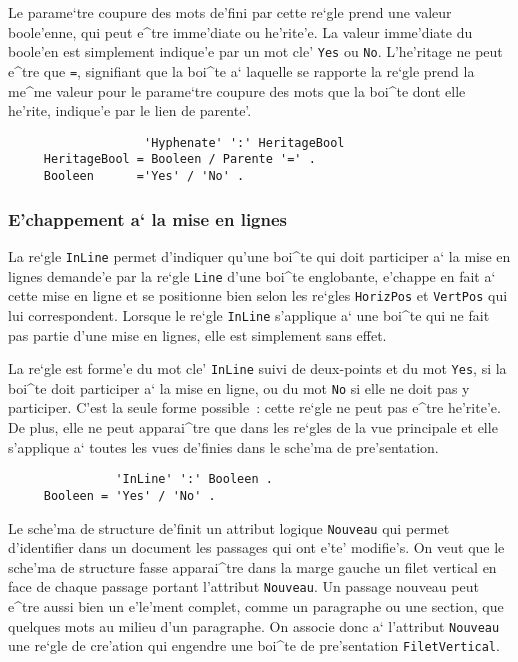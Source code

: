 {Le parame`tre coupure des mots de'fini
par cette re`gle prend une valeur boole'enne, qui peut e^tre imme'diate ou
he'rite'e. La valeur imme'diate du boole'en est simplement indique'e par un
mot cle' {\tt Yes} ou {\tt No}. L'he'ritage ne peut e^tre que {\tt =},
signifiant que la boi^te a` laquelle se rapporte la re`gle prend la me^me
valeur pour le parame`tre coupure des mots que la boi^te dont elle he'rite,
indique'e par le lien de parente'.

\begin{verbatim}
                   'Hyphenate' ':' HeritageBool
     HeritageBool = Booleen / Parente '=' .
     Booleen      ='Yes' / 'No' .
\end{verbatim}

\subsubsection{E'chappement a` la mise en lignes}
\label{regleinline}

La re`gle {\tt InLine} permet d'indiquer qu'une boi^te qui doit participer
a` la mise en lignes demande'e par la re`gle {\tt Line} d'une boi^te
englobante, e'chappe en fait a` cette mise en ligne et se positionne bien
selon les re`gles {\tt HorizPos} et {\tt VertPos} qui lui correspondent.
Lorsque le re`gle {\tt InLine} s'applique a` une boi^te qui ne fait pas
partie d'une mise en lignes, elle est simplement sans effet.

La re`gle est forme'e du mot cle' {\tt InLine} suivi de deux-points et du
mot {\tt Yes}, si la boi^te doit participer a` la mise en ligne, ou du
mot {\tt No} si elle ne doit pas y participer. C'est la seule forme
possible~: cette re`gle ne peut pas e^tre he'rite'e. De plus, elle ne peut
apparai^tre que dans les re`gles de la vue principale et elle s'applique a`
toutes les vues de'finies dans le sche'ma de pre'sentation.

\begin{verbatim}
               'InLine' ':' Booleen .
     Booleen = 'Yes' / 'No' .
\end{verbatim}

\begin{example}
Le sche'ma de structure de'finit un attribut logique {\tt Nouveau} qui permet
d'identifier dans un document les passages qui ont e'te' modifie's. On veut
que le sche'ma de structure fasse apparai^tre dans la marge gauche un filet
vertical en face de chaque passage portant l'attribut {\tt Nouveau}.
Un passage nouveau peut e^tre aussi bien un e'le'ment complet, comme un
paragraphe ou une section, que quelques mots au milieu d'un paragraphe.
On associe donc a` l'attribut {\tt Nouveau} une re`gle de cre'ation qui
engendre une boi^te de pre'sentation {\tt FiletVertical}.
 

\end{example}}
